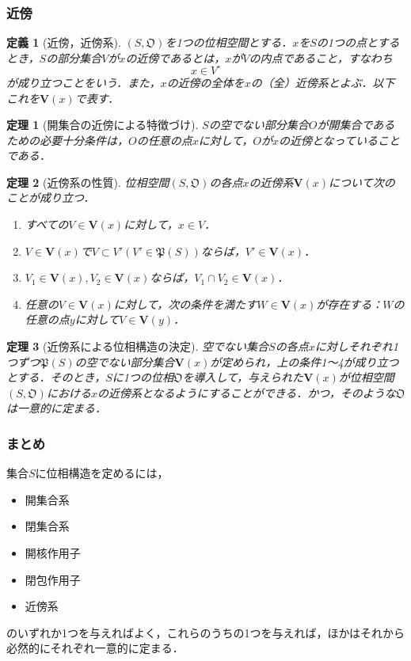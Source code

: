 \documentclass[a4paper,10pt,uplatex]{jsarticle}
\numberwithin{equation}{section}
\theoremstyle{mystyle}
\newtheorem{dfn}{定義}[section]
\newtheorem{thm}{定理}[section]
\newcommand{\gO}{\mathfrak{O}}
\newcommand{\gP}{\mathfrak{P}}
\begin{document}
\subsubsection{近傍}
\begin{dfn}[近傍，近傍系]
    $(S,\gO)$を1つの位相空間とする．$x$を$S$の1つの点とするとき，$S$の部分集合$V$が$x$の近傍であるとは，$x$が$V$の内点であること，すなわち
    \begin{equation}
        x \in V^\circ
    \end{equation}
    が成り立つことをいう．また，$x$の近傍の全体を$x$の（全）近傍系とよぶ．以下これを$\bm{V}(x)$で表す．
\end{dfn}

\begin{thm}[開集合の近傍による特徴づけ]
    $S$の空でない部分集合$O$が開集合であるための必要十分条件は，$O$の任意の点$x$に対して，$O$が$x$の近傍となっていることである．
\end{thm}

\begin{thm}[近傍系の性質]
    位相空間$(S,\gO)$の各点$x$の近傍系$\bm{V}(x)$について次のことが成り立つ．
    \begin{enumerate}
        \item すべての$V\in\bm{V}(x)$に対して，$x\in V$．
        \item $V\in\bm{V}(x)$で$V\subset V' (V' \in \gP(S))$ならば，$V' \in \bm{V}(x)$．
        \item $V_1 \in \bm{V}(x), V_2 \in \bm{V}(x)$ならば，$V_1\cap V_2 \in \bm{V}(x)$．
        \item 任意の$V \in \bm{V}(x)$に対して，次の条件を満たす$W \in \bm{V}(x)$が存在する：$W$の任意の点$y$に対して$V \in \bm{V}(y)$．
    \end{enumerate}
\end{thm}

\begin{thm}[近傍系による位相構造の決定]
    空でない集合$S$の各点$x$に対しそれぞれ1つずつ$\gP(S)$の空でない部分集合$\bm{V}(x)$が定められ，上の条件1〜4が成り立つとする．そのとき，$S$に1つの位相$\gO$を導入して，与えられた$\bm{V}(x)$が位相空間$(S,\gO)$における$x$の近傍系となるようにすることができる．かつ，そのような$\gO$は一意的に定まる．
\end{thm}

\subsubsection{まとめ}
集合$S$に位相構造を定めるには，
\begin{itemize}
    \item 開集合系
    \item 閉集合系
    \item 開核作用子
    \item 閉包作用子
    \item 近傍系
\end{itemize}
のいずれか1つを与えればよく，これらのうちの1つを与えれば，ほかはそれから必然的にそれぞれ一意的に定まる．
\end{document}
